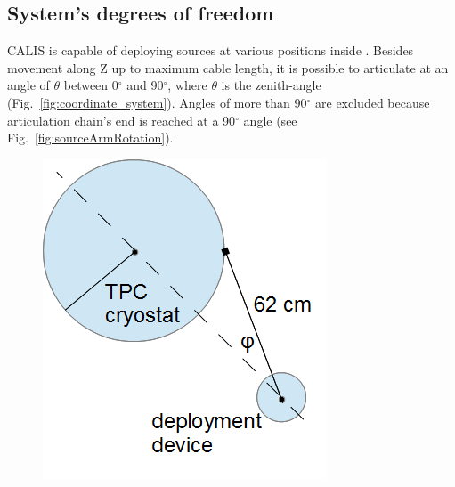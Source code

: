 \subsection{System's degrees of freedom}

CALIS is capable of deploying sources at various positions inside \lsv. Besides movement along Z up to maximum cable length, it is possible to articulate at an angle of $\theta$ between 0$^{\circ}$ and 90$^{\circ}$, where $\theta$ is the zenith-angle (Fig.~\ref{fig:coordinate_system}). Angles of more than 90$^{\circ}$ are excluded because articulation chain's end is reached at a 90$^{\circ}$ angle (see Fig.~\ref{fig:sourceArmRotation}).

\begin{figure}[htbp]
 \centering
  \includegraphics[height=0.37\textheight]{Figures/DeploymentDevice_XY_view}

\end{figure}
